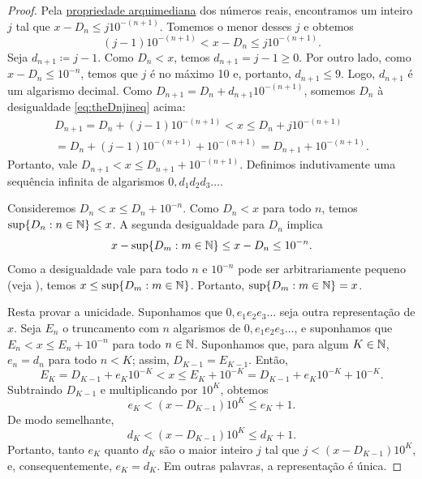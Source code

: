\begin{proof}
Pela
\hyperref[thm:arch:i]{propriedade arquimediana} dos números reais,
encontramos um inteiro $j$ tal que
$x-D_n \leq j {10}^{-(n+1)}$. Tomemos o menor desses $j$ e obtemos
\begin{equation} \label{eq:theDnjineq}
(j-1){10}^{-(n+1)} < x-D_n \leq j {10}^{-(n+1)} .
\end{equation}
Seja $d_{n+1} \coloneqq j-1$.
Como $D_n < x$,
temos $d_{n+1} = j-1 \geq 0$. Por outro lado, como
$x-D_n \leq {10}^{-n}$, temos que
$j$ é no máximo 10 e, portanto, $d_{n+1} \leq 9$.
Logo, $d_{n+1}$ é um algarismo decimal.
Como $D_{n+1} = D_n + d_{n+1} {10}^{-(n+1)}$,
somemos $D_n$ à desigualdade
\eqref{eq:theDnjineq} acima:
\begin{multline*}
D_{n+1} = D_n + (j-1){10}^{-(n+1)} < x
\leq
D_n + j {10}^{-(n+1)} \\
=
D_n + (j-1) {10}^{-(n+1)} +
{10}^{-(n+1)} = D_{n+1} + {10}^{-(n+1)} .
\end{multline*}
Portanto, vale
$D_{n+1} < x \leq D_{n+1} + {10}^{-(n+1)}$.
Definimos indutivamente
uma sequência infinita de algarismos $0{,}d_1d_2d_3\ldots$.

Consideremos $D_{n} < x \leq D_{n} + {10}^{-n}$.
Como $D_n < x$ para todo $n$, temos
$\sup \{ D_n : n \in {\mathbb{N}} \} \leq x$.
A segunda desigualdade para $D_n$ implica
\begin{equation*}
x - \sup \{ D_m : m \in {\mathbb{N}} \}
\leq
x - D_n \leq 10^{-n} .
\end{equation*}
Como a desigualdade vale para todo $n$ e
${10}^{-n}$ pode ser arbitrariamente pequeno
(veja ),
temos $x \leq \sup \{ D_m : m \in {\mathbb{N}} \}$.
Portanto, $\sup \{ D_m : m \in {\mathbb{N}} \} = x$.

Resta provar a unicidade.
Suponhamos que $0{,}e_1e_2e_3\ldots$ seja outra representação de $x$.
Seja $E_n$ o truncamento com $n$ algarismos de $0{,}e_1e_2e_3\ldots$, e suponhamos
que $E_n < x \leq E_n + {10}^{-n}$ para todo $n \in {\mathbb{N}}$.
Suponhamos que, para algum $K \in {\mathbb{N}}$, $e_n = d_n$ para todo $n < K$; assim,
$D_{K-1} = E_{K-1}$. Então,
\begin{equation*}
E_K = D_{K-1} + e_K{10}^{-K} < x \leq E_K + {10}^{-K} = D_{K-1} +
e_K{10}^{-K} + {10}^{-K} .
\end{equation*}
Subtraindo $D_{K-1}$ e multiplicando por ${10}^{K}$, obtemos
\begin{equation*}
e_K < (x - D_{K-1}){10}^K \leq e_K + 1 .
\end{equation*}
De modo semelhante,
\begin{equation*}
d_K < (x - D_{K-1}){10}^K \leq d_K + 1 .
\end{equation*}
Portanto, tanto $e_K$ quanto $d_K$ são o maior inteiro $j$
tal que $j < (x - D_{K-1}){10}^K$, e, consequentemente, $e_K = d_K$.
Em outras palavras, a representação é única.
\end{proof}


